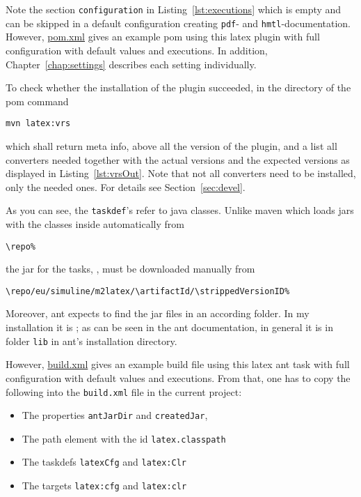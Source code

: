 Note the section \texttt{configuration} in Listing~\ref{lst:executions}
which is empty and can be skipped in a default configuration
creating \texttt{pdf}- and \texttt{hmtl}-documentation.
However, \href{\urlSite fromMain/pom4pdf.xml}{pom.xml} 
gives an example pom using this latex plugin 
with full configuration with default values and executions.
In addition, Chapter~\ref{chap:settings} describes each setting individually.

To check whether the installation of the plugin succeeded,
in the directory of the pom command
%
\begin{Verbatim}
mvn latex:vrs
\end{Verbatim}
%
which shall return meta info, above all the version of the plugin,
and a list all converters needed
together with the actual versions and the expected versions
as displayed in Listing~\ref{lst:vrsOut}.
Note that not all converters need to be installed, only the needed ones.
For details see Section~\ref{sec:devel}.
\medskip


As you can see, the \texttt{taskdef}'s refer to java classes.
Unlike maven which loads jars with the classes inside automatically
from
% 
\begin{Verbatim}[fontsize=\small, commandchars=\\\{\}]
\repo%
\end{Verbatim}
%
the jar for the tasks, \createdJar,
must be downloaded manually from
%
\begin{Verbatim}[fontsize=\scriptsize, commandchars=\\\{\}]
\repo/eu/simuline/m2latex/\artifactId/\strippedVersionID%
\end{Verbatim}
%
Moreover, ant expects to find the jar files in an according folder.
In my installation it is \antJarDir;
as can be seen in the ant documentation,
in general it is in folder \texttt{lib} in ant's installation directory. 

However, \href{\urlSite build.xml}{build.xml} 
gives an example build file using this latex ant task 
with full configuration with default values and executions.
From that, one has to copy the following
into the \texttt{build.xml} file in the current project:
%
\begin{itemize}
\item The properties \texttt{antJarDir} and \texttt{createdJar}, 
\item The path element with the id \texttt{latex.classpath}
\item The taskdefs \texttt{latexCfg}  and \texttt{latex:Clr}
\item The  targets \texttt{latex:cfg} and \texttt{latex:clr}
\end{itemize}

